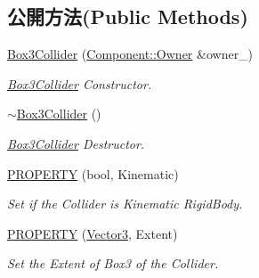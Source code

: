 \subsection*{公開方法(Public Methods)}
\begin{DoxyCompactItemize}
\item 
\hyperlink{class_i_dream_sky_1_1_box3_collider_ae3d4cfe7fe036b9ca1d1ae0acc000cbf}{Box3\+Collider} (\hyperlink{class_i_dream_sky_1_1_component_1_1_owner}{Component\+::\+Owner} \&owner\+\_\+)
\begin{DoxyCompactList}\small\item\em \hyperlink{class_i_dream_sky_1_1_box3_collider}{Box3\+Collider} Constructor. \end{DoxyCompactList}\item 
\hyperlink{class_i_dream_sky_1_1_box3_collider_ad9a35676b5bd29f476064cadef3f648c}{$\sim$\+Box3\+Collider} ()
\begin{DoxyCompactList}\small\item\em \hyperlink{class_i_dream_sky_1_1_box3_collider}{Box3\+Collider} Destructor. \end{DoxyCompactList}\item 
\hyperlink{class_i_dream_sky_1_1_box3_collider_aa19369ce1e2866a12b1fa3320ee5d894}{P\+R\+O\+P\+E\+R\+TY} (bool, Kinematic)
\begin{DoxyCompactList}\small\item\em Set if the Collider is Kinematic Rigid\+Body. \end{DoxyCompactList}\item 
\hyperlink{class_i_dream_sky_1_1_box3_collider_a34d680879d8996cbd7725e7c88de8fa6}{P\+R\+O\+P\+E\+R\+TY} (\hyperlink{class_i_dream_sky_1_1_vector3}{Vector3}, Extent)
\begin{DoxyCompactList}\small\item\em Set the Extent of Box3 of the Collider. \end{DoxyCompactList}\end{DoxyCompactItemize}
